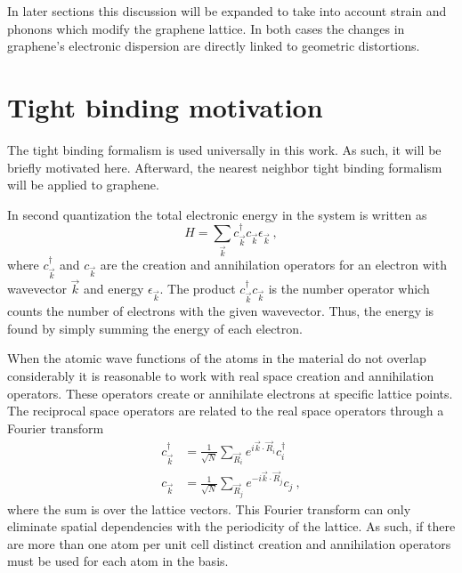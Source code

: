 In later sections this discussion will be expanded to take into account strain and phonons which modify the graphene lattice.
In both cases the changes in graphene's electronic dispersion are directly linked to geometric distortions.

\section{Tight binding motivation}
The tight binding formalism is used universally in this work.
As such, it will be briefly motivated here.
Afterward, the nearest neighbor tight binding formalism will be applied to graphene.

In second quantization the total electronic energy in the system is written as
\begin{equation*}
	H=\sum_{\vec{k}} c^{\dagger}_{\vec{k}} c_{\vec{k}} \epsilon_{\vec{k}} \ ,
\end{equation*}
where $c^{\dagger}_{\vec{k}}$ and $c_{\vec{k}}$ are the creation and annihilation operators for an electron with wavevector $\vec{k}$ and energy $\epsilon_{\vec{k}}$.
The product $c^{\dagger}_{\vec{k}} c_{\vec{k}}$ is the number operator which counts the number of electrons with the given wavevector.
Thus, the energy is found by simply summing the energy of each electron.

When the atomic wave functions of the atoms in the material do not overlap considerably it is reasonable to work with real space creation and annihilation operators.
These operators create or annihilate electrons at specific lattice points.
The reciprocal space operators are related to the real space operators through a Fourier transform
\begin{align*}
	c^{\dagger}_{\vec{k}}&=\frac{1}{\sqrt{N}}\sum_{\vec{R}_i} e^{ i \vec{k} \cdot \vec{R}_i} c^{\dagger}_{i} \\
	c          _{\vec{k}}&=\frac{1}{\sqrt{N}}\sum_{\vec{R}_j} e^{-i \vec{k} \cdot \vec{R}_j} c_{j} \ ,
\end{align*}
where the sum is over the lattice vectors.
This Fourier transform can only eliminate spatial dependencies with the periodicity of the lattice.
As such, if there are more than one atom per unit cell distinct creation and annihilation operators must be used for each atom in the basis.

